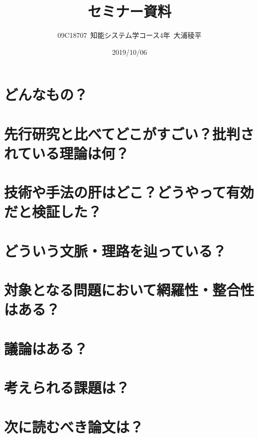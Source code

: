 \documentclass[10.5pt,a4j]{jsarticle}
\title{セミナー資料}
\author{09C18707\ 知能システム学コース4年\ 大浦稜平}
\date{2019/10/06}
\begin{document}
\maketitle

\section{どんなもの？}

\section{先行研究と比べてどこがすごい？批判されている理論は何？}

\section{技術や手法の肝はどこ？どうやって有効だと検証した？}

\section{どういう文脈・理路を辿っている？}

\section{対象となる問題において網羅性・整合性はある？}

\section{議論はある？}

\section{考えられる課題は？}

\section{次に読むべき論文は？}
\end{document}
